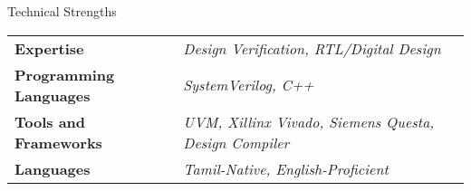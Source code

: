 \documentclass[
	11pt, %
]{./assets/resume} %
\begin{document}
	




\begin{rSection}{Technical Strengths}

	\def\arraystretch{1.5}

	\begin{tabular}{ l l}
		\textbf{Expertise} & \emph{Design Verification, RTL/Digital Design} \\
		\textbf{Programming Languages} & \emph{SystemVerilog, C++} \\
		\textbf{Tools and Frameworks} & \emph{UVM, Xillinx Vivado, Siemens Questa, Design Compiler} \\ 
		\textbf{Languages} & \emph{Tamil-Native, English-Proficient} \\
	\end{tabular}

\end{rSection}

\end{document}
